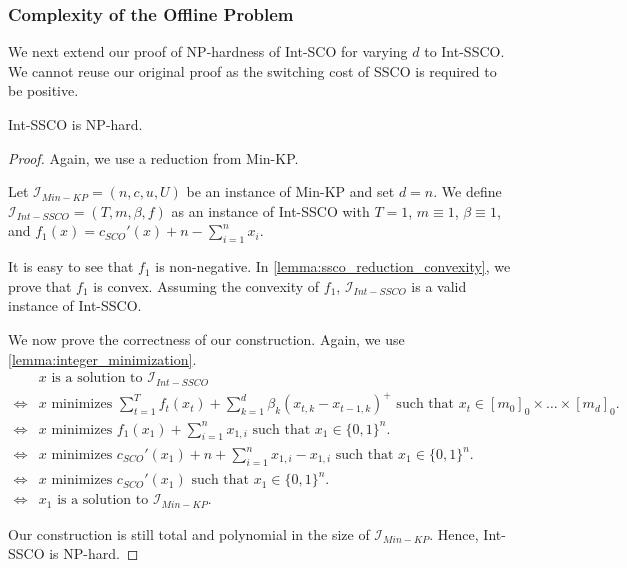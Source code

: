 \subsubsection{Complexity of the Offline Problem}

We next extend our proof of NP-hardness of Int-SCO for varying $d$ to Int-SSCO. We cannot reuse our original proof as the switching cost of SSCO is required to be positive.

\begin{theorem}
\label{theorem:int_ssco_np_hardness}
Int-SSCO is NP-hard.
\end{theorem}
\begin{proof}
Again, we use a reduction from Min-KP.

Let $\mathcal{I}_{Min-KP} = (n, c, u, U)$ be an instance of Min-KP and set $d = n$. We define $\mathcal{I}_{Int-SSCO} = (T, m, \beta, f)$ as an instance of Int-SSCO with $T = 1$, $m \equiv 1$, $\beta \equiv 1$, and $f_1(x) = c_{SCO}'(x) + n - \sum_{i=1}^n x_i$.

It is easy to see that $f_1$ is non-negative. In \autoref{lemma:ssco_reduction_convexity}, we prove that $f_1$ is convex. Assuming the convexity of $f_1$, $\mathcal{I}_{Int-SSCO}$ is a valid instance of Int-SSCO.

We now prove the correctness of our construction. Again, we use \autoref{lemma:integer_minimization}. \begin{align*}
         &x \text{ is a solution to } \mathcal{I}_{Int-SSCO} \\
    \iff &x \text{ minimizes } \sum_{t=1}^T f_t(x_t) + \sum_{k=1}^d \beta_k (x_{t,k} - x_{t-1,k})^+ \text{ such that } x_t \in [m_0]_0 \times \dots \times [m_d]_0. \\
    \iff &x \text{ minimizes } f_1(x_1) + \sum_{i=1}^n x_{1,i} \text{ such that } x_1 \in \{0,1\}^n. \\
    \iff &x \text{ minimizes } c_{SCO}'(x_1) + n + \sum_{i=1}^n x_{1,i} - x_{1,i} \text{ such that } x_1 \in \{0,1\}^n. \\
    \iff &x \text{ minimizes } c_{SCO}'(x_1) \text{ such that } x_1 \in \{0,1\}^n. \\
    \iff &x_1 \text{ is a solution to } \mathcal{I}_{Min-KP}.
\end{align*}

Our construction is still total and polynomial in the size of $\mathcal{I}_{Min-KP}$. Hence, Int-SSCO is NP-hard.
\end{proof}

